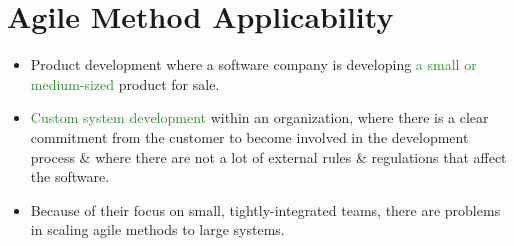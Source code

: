 \documentclass{report}
\newcommand{\textg}[1]{\textcolor{ForestGreen}{#1}}
\begin{document}
\newpage
\section{Agile Method Applicability}
\begin{itemize}
  \item Product development where a software company is developing \textg{a small or medium-sized} product for sale.
  \item \textg{Custom system development} within an organization, where there is a clear commitment from the customer to become involved in the development process \& where there are not a lot of external rules \& regulations that affect the software.
  \item Because of their focus on small, tightly-integrated teams, there are problems in scaling agile methods to large systems.
\end{itemize}  
  
\end{document}
